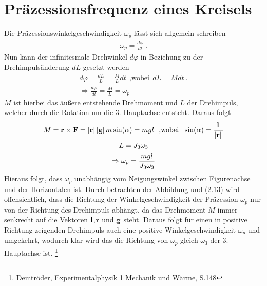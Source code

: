 

\section{Präzessionsfrequenz eines Kreisels}

Die Präzessionswinkelgeschwindigkeit $\omega_p$ lässt sich allgemein schreiben 
\begin{align}
    \omega_p = \frac{d\varphi}{dt}~.
\end{align}
Nun kann der infinitesmale Drehwinkel $d\varphi$ in Beziehung zu der Drehimpulsänderung $dL$ gesetzt werden
\begin{gather}
    d\varphi = \frac{dL}{L} = \frac{M}{L} dt~~\text{,wobei}~~dL = M dt~.\\
    \Rightarrow \frac{d\varphi}{dt} = \frac{M}{L} = \omega_p
\end{gather}
$M$ ist hierbei das äußere entstehende Drehmoment und $L$ der Drehimpuls, welcher durch die Rotation um die 3. Hauptachse entsteht. Daraus folgt
\begin{gather}
    M = \boldsymbol{\mathbf{r}} \times \boldsymbol{\mathbf{F}} = \abs*{\boldsymbol{\mathbf{r}}}\abs*{\boldsymbol{\mathbf{g}}}m\sin(\alpha) = mgl~~\text{,wobei}~~\sin(\alpha)=\frac{\abs*{\boldsymbol{\mathbf{l}}}}{\abs*{\boldsymbol{\mathbf{r}}}}\\
    L = J_3\omega_3\\
    \Rightarrow \omega_p = \frac{mgl}{J_3\omega_3}
\end{gather}
Hieraus folgt, dass $\omega_p$ unabhängig vom Neigungswinkel zwischen Figurenachse und der Horizontalen ist. Durch betrachten der Abbildung und (2.13) wird offensichtlich, dass die Richtung der Winkelgeschwindigkeit der Präzession $\omega_p$ nur von der Richtung des Drehimpuls abhängt, da das Drehmoment $M$ immer senkrecht auf die Vektoren $\boldsymbol{\mathbf{l}}$,$\boldsymbol{\mathbf{r}}$ und $\boldsymbol{\mathbf{g}}$ steht. Daraus folgt für einen in positive Richtung zeigenden Drehimpuls auch eine positive Winkelgeschwindigkeit $\omega_p$ und umgekehrt, wodurch klar wird das die Richtung von $\omega_p$ gleich $\omega_3$ der 3. Hauptachse ist. \footnote{Demtröder, Experimentalphysik 1 Mechanik und Wärme, S.148}